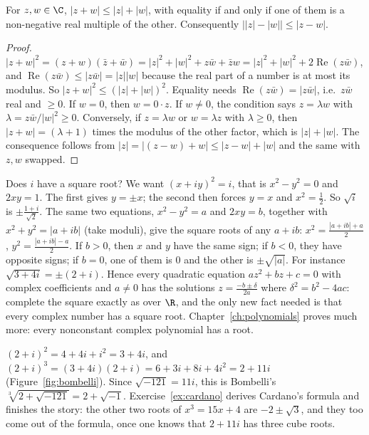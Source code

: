 \begin{propositionx}
For $z,w\in\C$, $|z+w|\le|z|+|w|$, with equality if and only if one of them is a non-negative real multiple of the other. Consequently
$\bigl||z|-|w|\bigr|\le|z-w|$.
\end{propositionx}
\begin{proof}
$|z+w|^2=(z+w)(\bar z+\bar w)=|z|^2+|w|^2+z\bar w+\bar zw=|z|^2+|w|^2+2\operatorname{Re}(z\bar w)$, and $\operatorname{Re}(z\bar w)\le|z\bar w|=|z||w|$
because the real part of a number is at most its modulus. So $|z+w|^2\le(|z|+|w|)^2$. Equality needs $\operatorname{Re}(z\bar w)=|z\bar w|$, i.e.\ $z\bar w$
real and $\ge0$. If $w=0$, then $w=0\cdot z$. If $w\ne0$, the condition says $z=\lambda w$ with $\lambda=z\bar w/|w|^2\ge0$. Conversely, if $z=\lambda w$ or $w=\lambda z$ with $\lambda\ge0$, then $|z+w|=(\lambda+1)$ times the modulus of the other factor, which is $|z|+|w|$. The consequence follows from $|z|=|(z-w)+w|\le|z-w|+|w|$ and the same with $z,w$ swapped.
\end{proof}

\begin{examplex}
Does $i$ have a square root? We want $(x+iy)^2=i$, that is $x^2-y^2=0$ and $2xy=1$. The first gives $y=\pm x$; the second then forces $y=x$ and
$x^2=\frac12$. So $\sqrt i$ is $\pm\frac{1+i}{\sqrt2}$. The same two equations, $x^2-y^2=a$ and $2xy=b$, together with $x^2+y^2=|a+ib|$ (take moduli),
give the square roots of any $a+ib$: $x^2=\frac{|a+ib|+a}2$, $y^2=\frac{|a+ib|-a}2$. If $b>0$, then $x$ and $y$ have the same sign; if $b<0$, they have opposite signs; if $b=0$, one of them is $0$ and the other is $\pm\sqrt{|a|}$.
For instance $\sqrt{3+4i}=\pm(2+i)$. Hence every quadratic equation $az^2+bz+c=0$ with complex coefficients and $a\ne0$ has the solutions
$z=\frac{-b\pm\delta}{2a}$ where $\delta^2=b^2-4ac$: complete the square exactly as over $\R$, and the only new fact needed is that every complex
number has a square root. Chapter~\ref{ch:polynomials} proves much more: every nonconstant complex polynomial has a root.
\end{examplex}

\begin{examplex}
$(2+i)^2=4+4i+i^2=3+4i$, and $(2+i)^3=(3+4i)(2+i)=6+3i+8i+4i^2=2+11i$ (Figure~\ref{fig:bombelli}). Since $\sqrt{-121}=11i$, this is Bombelli's
$\sqrt[3]{2+\sqrt{-121}}=2+\sqrt{-1}$. Exercise~\ref{ex:cardano} derives Cardano's formula and finishes the story: the other two roots of
$x^3=15x+4$ are $-2\pm\sqrt3$, and they too come out of the formula, once one knows that $2+11i$ has three cube roots.
\end{examplex}

